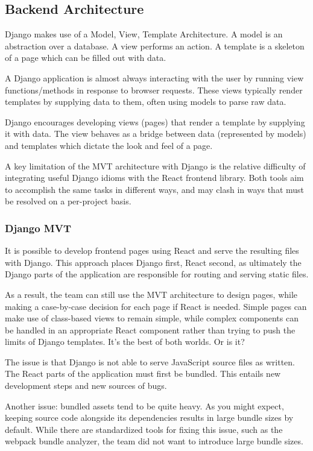 \documentclass[12pt,titlepage]{article}
\begin{document}
\subsection{Backend Architecture}
Django makes use of a Model, View, Template Architecture. A model is an abstraction over a database. A view performs an action. A template is a skeleton of a page which can be filled out with data.

A Django application is almost always interacting with the user by running view functions/methods in response to browser requests. These views typically render templates by supplying data to them, often using models to parse raw data.

Django encourages developing views (pages) that render a template by supplying it with data. The view behaves as a bridge between data (represented by models) and templates which dictate the look and feel of a page.

A key limitation of the MVT architecture with Django is the relative difficulty of integrating useful Django idioms with the React frontend library. Both tools aim to accomplish the same tasks in different ways, and may clash in ways that must be resolved on a per-project basis.

\subsubsection{Django MVT}
It is possible to develop frontend pages using React and serve the resulting files with Django. This approach places Django first, React second, as ultimately the Django parts of the application are responsible for routing and serving static files.

As a result, the team can still use the MVT architecture to design pages, while making a case-by-case decision for each page if React is needed. Simple pages can make use of class-based views to remain simple, while complex components can be handled in an appropriate React component rather than trying to push the limits of Django templates. It's the best of both worlds. Or is it?

The issue is that Django is not able to serve JavaScript source files as written. The React parts of the application must first be bundled. This entails new development steps and new sources of bugs.

Another issue: bundled assets tend to be quite heavy. As you might expect, keeping source code alongside its dependencies results in large bundle sizes by default. While there are standardized tools for fixing this issue, such as the webpack bundle analyzer, the team did not want to introduce large bundle sizes.
\end{document}
